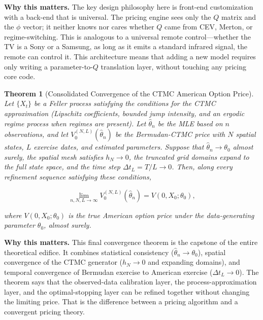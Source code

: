 \documentclass[11pt,a4paper,openany]{book}
\theoremstyle{definition}
\theoremstyle{plain}
\newtheorem{theorem}{Theorem}[chapter]
\theoremstyle{remark}
\newcommand{\1}{\mathbbm{1}}
\begin{document}
\medskip
\noindent\textbf{Why this matters.} The key design philosophy here is front-end customization with a back-end that is universal. The pricing engine sees only the $Q$ matrix and the $\phi$ vector; it neither knows nor cares whether $Q$ came from CEV, Merton, or regime-switching. This is analogous to a universal remote control---whether the TV is a Sony or a Samsung, as long as it emits a standard infrared signal, the remote can control it. This architecture means that adding a new model requires only writing a parameter-to-$Q$ translation layer, without touching any pricing core code.

\begin{theorem}[Consolidated Convergence of the CTMC American Option Price]
Let $\{X_{t}\}$ be a Feller process satisfying the conditions for the CTMC approximation (Lipschitz coefficients, bounded jump intensity, and an ergodic regime process when regimes are present). Let $\hat{\theta}_{n}$ be the MLE based on $n$ observations, and let $V_{0}^{(N, L)}(\hat{\theta}_{n})$ be the Bermudan-CTMC price with $N$ spatial states, $L$ exercise dates, and estimated parameters. Suppose that $\hat{\theta}_{n} \to \theta_{0}$ almost surely, the spatial mesh satisfies $h_N \to 0$, the truncated grid domains expand to the full state space, and the time step $\Delta t_L = T/L \to 0$. Then, along every refinement sequence satisfying these conditions,

\[
\lim_{n,N,L \to \infty} V_{0}^{(N, L)}(\hat{\theta}_{n}) = V(0, X_{0}; \theta_{0}),
\]

where $V(0, X_{0}; \theta_{0})$ is the true American option price under the data-generating parameter $\theta_{0}$, almost surely.
\end{theorem}

\medskip
\noindent\textbf{Why this matters.} This final convergence theorem is the capstone of the entire theoretical edifice. It combines statistical consistency ($\hat{\theta}_{n} \to \theta_{0}$), spatial convergence of the CTMC generator ($h_N \to 0$ and expanding domains), and temporal convergence of Bermudan exercise to American exercise ($\Delta t_L \to 0$). The theorem says that the observed-data calibration layer, the process-approximation layer, and the optimal-stopping layer can be refined together without changing the limiting price. That is the difference between a pricing algorithm and a convergent pricing theory.

\appendix
\renewcommand{\thechapter}{\Alph{chapter}}
\end{document}
